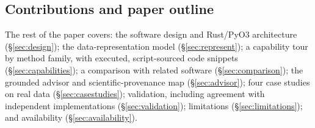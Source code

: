 \subsection*{Contributions and paper outline}

The rest of the paper covers: the software design and Rust/PyO3 architecture
(\S\ref{sec:design}); the data-representation model (\S\ref{sec:represent});
a capability tour by method family, with executed, script-sourced code snippets
(\S\ref{sec:capabilities}); a comparison with related software
(\S\ref{sec:comparison}); the grounded advisor and scientific-provenance map
(\S\ref{sec:advisor}); four case studies on real data
(\S\ref{sec:casestudies}); validation, including agreement with independent
implementations (\S\ref{sec:validation}); limitations
(\S\ref{sec:limitations}); and availability (\S\ref{sec:availability}).
